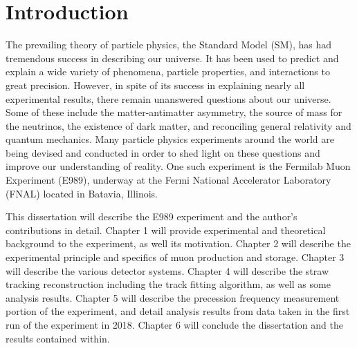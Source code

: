 
\thispagestyle{myheadings}
\graphicspath{{Body/Figures/Theory/}}

\chapter{Introduction}
\label{chapter:Introduction}

The prevailing theory of particle physics, the Standard Model (SM), has had tremendous success in describing our universe. It has been used to predict and explain a wide variety of phenomena, particle properties, and interactions to great precision. However, in spite of its success in explaining nearly all experimental results, there remain unanswered questions about our universe. Some of these include the matter-antimatter asymmetry, the source of mass for the neutrinos, the existence of dark matter, and reconciling general relativity and quantum mechanics. Many particle physics experiments around the world are being devised and conducted in order to shed light on these questions and improve our understanding of reality. One such experiment is the Fermilab Muon \gmtwo Experiment (E989), underway at the Fermi National Accelerator Laboratory (FNAL) located in Batavia, Illinois.


This dissertation will describe the E989 experiment and the author's contributions in detail. Chapter 1 will provide experimental and theoretical background to the experiment, as well its motivation. Chapter 2 will describe the experimental principle and specifics of muon production and storage. Chapter 3 will describe the various detector systems. Chapter 4 will describe the straw tracking reconstruction including the track fitting algorithm, as well as some analysis results. Chapter 5 will describe the precession frequency measurement portion of the experiment, and detail analysis results from data taken in the first run of the experiment in 2018. Chapter 6 will conclude the dissertation and the results contained within.



